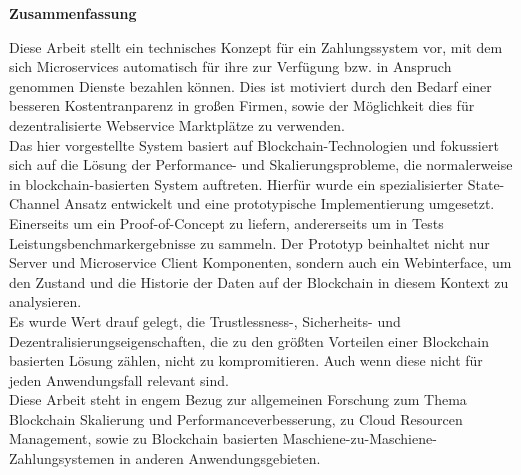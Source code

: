 \thispagestyle{empty}
\vspace*{0.2cm}

\begin{center}
    \textbf{Zusammenfassung}
\end{center}

\vspace*{0.2cm}

\noindent

Diese Arbeit stellt ein technisches Konzept f\"ur ein Zahlungssystem vor, mit dem sich Microservices automatisch f\"ur ihre zur Verf\"ugung bzw. in Anspruch genommen Dienste bezahlen k\"onnen. Dies ist motiviert durch den Bedarf einer besseren Kostentranparenz in gro\ss{}en Firmen, sowie der M\"oglichkeit dies f\"ur dezentralisierte Webservice Marktpl\"atze zu verwenden.\\

Das hier vorgestellte System basiert auf Blockchain-Technologien und fokussiert sich auf die L\"osung der Performance- und Skalierungsprobleme, die normalerweise in blockchain-basierten System auftreten. Hierf\"ur wurde ein spezialisierter State-Channel Ansatz entwickelt und eine prototypische Implementierung umgesetzt. Einerseits um ein Proof-of-Concept zu liefern, andererseits um in Tests Leistungsbenchmarkergebnisse zu sammeln. Der Prototyp beinhaltet nicht nur Server und Microservice Client Komponenten, sondern auch ein Webinterface, um den Zustand und die Historie der Daten auf der Blockchain in diesem Kontext zu analysieren.\\

Es wurde Wert drauf gelegt, die Trustlessness-, Sicherheits- und Dezentralisierungseigenschaften, die zu den gr\"o\ss{}ten Vorteilen einer Blockchain basierten L\"osung z\"ahlen, nicht zu kompromitieren. Auch wenn diese nicht f\"ur jeden Anwendungsfall relevant sind.\\

Diese Arbeit steht in engem Bezug zur allgemeinen Forschung zum Thema Blockchain Skalierung und Performanceverbesserung, zu Cloud Resourcen Management, sowie zu Blockchain basierten Maschiene-zu-Maschiene-Zahlungsystemen in anderen Anwendungsgebieten.
